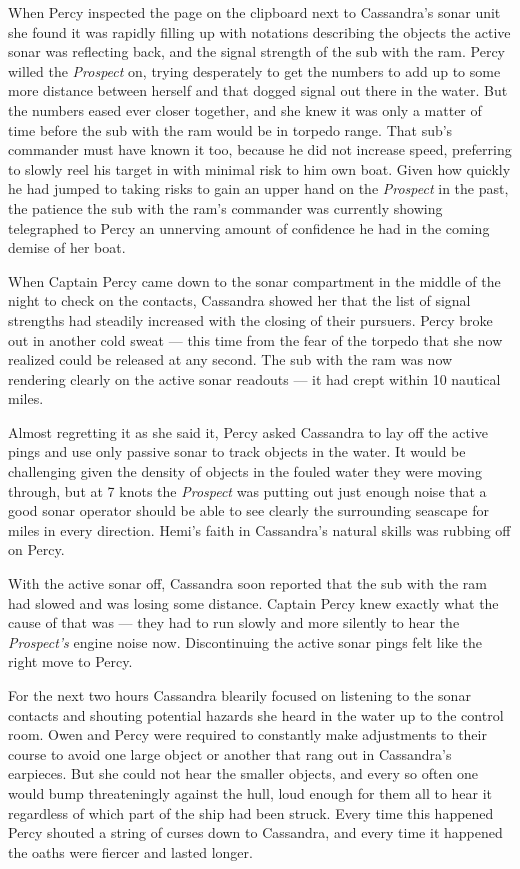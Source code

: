 \documentclass[
]{scrbook}
\begin{document}
When Percy inspected the page on the clipboard next to Cassandra's sonar
unit she found it was rapidly filling up with notations describing the
objects the active sonar was reflecting back, and the signal strength of
the sub with the ram. Percy willed the \emph{Prospect} on, trying
desperately to get the numbers to add up to some more distance between
herself and that dogged signal out there in the water. But the numbers
eased ever closer together, and she knew it was only a matter of time
before the sub with the ram would be in torpedo range. That sub's
commander must have known it too, because he did not increase speed,
preferring to slowly reel his target in with minimal risk to him own
boat. Given how quickly he had jumped to taking risks to gain an upper
hand on the \emph{Prospect} in the past, the patience the sub with the
ram's commander was currently showing telegraphed to Percy an unnerving
amount of confidence he had in the coming demise of her boat.

When Captain Percy came down to the sonar compartment in the middle of
the night to check on the contacts, Cassandra showed her that the list
of signal strengths had steadily increased with the closing of their
pursuers. Percy broke out in another cold sweat --- this time from the
fear of the torpedo that she now realized could be released at any
second. The sub with the ram was now rendering clearly on the active
sonar readouts --- it had crept within 10 nautical miles.

Almost regretting it as she said it, Percy asked Cassandra to lay off
the active pings and use only passive sonar to track objects in the
water. It would be challenging given the density of objects in the
fouled water they were moving through, but at 7 knots the
\emph{Prospect} was putting out just enough noise that a good sonar
operator should be able to see clearly the surrounding seascape for
miles in every direction. Hemi's faith in Cassandra's natural skills was
rubbing off on Percy.

With the active sonar off, Cassandra soon reported that the sub with the
ram had slowed and was losing some distance. Captain Percy knew exactly
what the cause of that was --- they had to run slowly and more silently
to hear the \emph{Prospect's} engine noise now. Discontinuing the active
sonar pings felt like the right move to Percy.

For the next two hours Cassandra blearily focused on listening to the
sonar contacts and shouting potential hazards she heard in the water up
to the control room. Owen and Percy were required to constantly make
adjustments to their course to avoid one large object or another that
rang out in Cassandra's earpieces. But she could not hear the smaller
objects, and every so often one would bump threateningly against the
hull, loud enough for them all to hear it regardless of which part of
the ship had been struck. Every time this happened Percy shouted a
string of curses down to Cassandra, and every time it happened the oaths
were fiercer and lasted longer.
\end{document}
